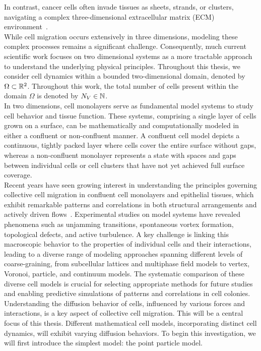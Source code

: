 In contrast, cancer cells often invade tissues as sheets, strands, or clusters, navigating a complex three-dimensional extracellular matrix (ECM) environment~\cite{friedl2009, cai2014, clark2015}. \\
While cell migration occurs extensively in three dimensions, modeling these complex processes remains a significant challenge. 
Consequently, much current scientific work focuses on two dimensional systems as a more tractable approach to understand the underlying physical principles.
Throughout this thesis, we consider cell dynamics within a bounded two-dimensional domain, denoted by $\Omega \subset \mathbb{R}^2$. 
Throughout this work, the total number of cells present within the domain $\Omega$ is denoted by $N_V \in \mathbb{N}$. \\
In two dimensions, cell monolayers serve as fundamental model systems to study cell behavior and tissue function. 
These systems, comprising a single layer of cells grown on a surface, can be mathematically and computationally modeled in either a confluent or non-confluent manner. 
A confluent cell model depicts a continuous, tightly packed layer where cells cover the entire surface without gaps, whereas a non-confluent monolayer represents a state with spaces and gaps between individual cells or cell clusters that have not yet achieved full surface coverage. \\
Recent years have seen growing interest in understanding the principles governing collective cell migration in confluent cell monolayers and epithelial tissues, which exhibit remarkable patterns and correlations in both structural arrangements and actively driven flows~\cite{wenzel2021}. 
Experimental studies on model systems have revealed phenomena such as unjamming transitions, spontaneous vortex formation, topological defects, and active turbulence. 
A key challenge is linking this macroscopic behavior to the properties of individual cells and their interactions, leading to a diverse range of modeling approaches spanning different levels of coarse-graining, from subcellular lattices and multiphase field models to vertex, Voronoi, particle, and continuum models. 
The systematic comparison of these diverse cell models is crucial for selecting appropriate methods for future studies and enabling predictive simulations of patterns and correlations in cell colonies. \\
Understanding the diffusion behavior of cells, influenced by various forces and interactions, is a key aspect of collective cell migration. This will be a central focus of this thesis. Different mathematical cell models, incorporating distinct cell dynamics, will exhibit varying diffusion behaviors. To begin this investigation, we will first introduce the simplest model: the point particle model. \\

